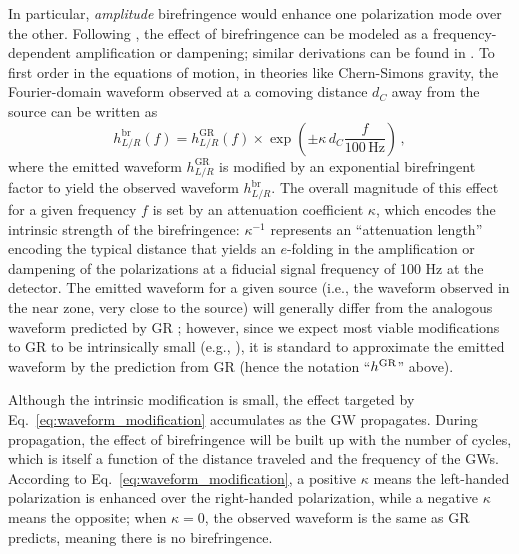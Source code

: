 \documentclass[aps,prd,twocolumn,superscriptaddress,preprintnumbers,nofootinbib]{revtex4-2}
\begin{document}
In particular, \emph{amplitude} birefringence would enhance one polarization mode over the other.
Following \cite{Alexander:2009tp}, the effect of birefringence can be modeled as a frequency-dependent amplification or dampening; similar derivations can be found in \cite{Zhao:2019xmm, Ezquiaga:2021ler, Zhu:2023wci,Jenks:2023pmk}.
To first order in the equations of motion, in theories like Chern-Simons gravity, the Fourier-domain waveform observed at a comoving distance $d_C$ away from the source can be written as
\begin{equation}
    h_{L/R}^{\mathrm{br}}(f) =
    h_{L/R}^{\mathrm{GR}}(f) \times
    \exp\left(\pm\kappa\, d_C \frac{f}{100\,\mathrm{Hz}}\right)\,,
    \label{eq:waveform_modification}
\end{equation}
where the emitted waveform $h_{L/R}^{\mathrm{GR}}$ is modified by an exponential birefringent factor to yield the observed waveform $h_{L/R}^{\mathrm{br}}$.
The overall magnitude of this effect for a given frequency $f$ is set by an attenuation coefficient $\kappa$, which encodes the intrinsic strength of the birefringence:
$\kappa^{-1}$ represents an ``attenuation length'' encoding the typical distance that yields an $e$-folding in the amplification or dampening of the polarizations at a fiducial signal frequency of 100 Hz at the detector.
The emitted waveform for a given source (i.e., the waveform observed in the near zone, very close to the source) will generally differ from the analogous waveform predicted by \ac{GR} \cite{Alexander:2009tp,Okounkova:2019zjf}; however, since we expect most viable modifications to \ac{GR} to be intrinsically small (e.g., \cite{Okounkova:2022grv}), it is standard to approximate the emitted waveform by the prediction from \ac{GR} (hence the notation ``$h^{\rm GR}$'' above).

Although the intrinsic modification is small, the effect targeted by Eq.~\eqref{eq:waveform_modification} accumulates as the \ac{GW} propagates.
During propagation, the effect of birefringence will be built up with the number of cycles, which is itself a function of the distance traveled and the frequency of the \acp{GW}.
According to Eq.~\eqref{eq:waveform_modification}, a positive $\kappa$ means the left-handed polarization is enhanced over the right-handed polarization, while a negative $\kappa$ means the opposite;
when $\kappa=0$, the observed waveform is the same as \ac{GR} predicts, meaning there is no birefringence.
\end{document}
